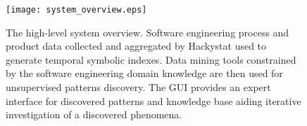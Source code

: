 \begin{figure}[tbp]
   \centering
   \texttt{[image: system\_overview.eps]}
   \caption{The high-level system overview. Software engineering process and product data collected and aggregated by Hackystat used to generate temporal symbolic indexes. Data mining tools constrained by the software engineering domain knowledge are then used for unsupervised patterns discovery. The GUI provides an expert interface for discovered patterns and knowledge base aiding iterative investigation of a discovered phenomena.}
   \label{fig:system_overview}
\end{figure}
